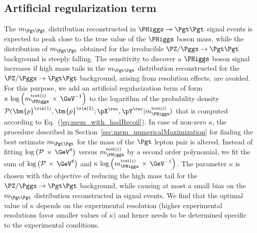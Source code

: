\subsection{Artificial regularization term}
\label{sec:mem_logM}

The $m_{\Pgt\Pgt}$ distribution reconstructed in $\PHiggs \to \Pgt\Pgt$ signal events is expected to peak close to the true value of the $\PHiggs$ boson mass,
while the distribution of $m_{\Pgt\Pgt}$ obtained for the irreducible $\PZ/\Pggx \to \Pgt\Pgt$ background is steeply falling.
The sensitivity to discover a $\PHiggs$ boson signal increases if high mass tails in the $m_{\Pgt\Pgt}$ distribution reconstructed 
for the $\PZ/\Pggx \to \Pgt\Pgt$ background, arising from resolution effects, are avoided.
For this purpose,
we add an artificial regularization term of form 
$\kappa \, \log \left( m_{\PHiggs}^{\textrm{test}(i)} \, \times \, \mbox{\GeV}^{-1} \right)$ 
to the logarithm of the probability density $\mathcal{P}(\bm{p}^{\vis(1)},\bm{p}^{\vis(2)};\pX^{\rec},\pY^{\rec}|m_{\PHiggs}^{\textrm{test}(i)})$
that is computed according to Eq.~(\ref{eq:mem_with_hadRecoil}).
In case of non-zero $\kappa$,
the procedure described in Section~\ref{sec:mem_numericalMaximization} for finding the best estimate $m_{\Pgt\Pgt}$ for the mass of the $\Pgt$ lepton pair is altered.
Instead of fitting 
$\log \left( \mathcal{P} \, \times \, \mbox{\GeV}^{8} \right)$ 
versus $m_{\PHiggs}^{\textrm{test}(i)}$ by a second order polynomial,
we fit the sum of $\log \left( \mathcal{P} \, \times \, \mbox{\GeV}^{8} \right)$
and $\kappa \, \log \left( m_{\PHiggs}^{\textrm{test}(i)} \, \times \, \mbox{\GeV}^{-1} \right)$.
The parameter $\kappa$ is chosen with the objective of reducing the high mass tail for the $\PZ/\Pggx \to \Pgt\Pgt$ background,
while causing at most a small bias on the $m_{\Pgt\Pgt}$ distribution reconstructed in signal events.
We find that the optimal value of $\kappa$ depends on the experimental resolution
(higher experimental resolutions favor smaller values of $\kappa$) and hence needs to be determined specific to the experimental conditions.
